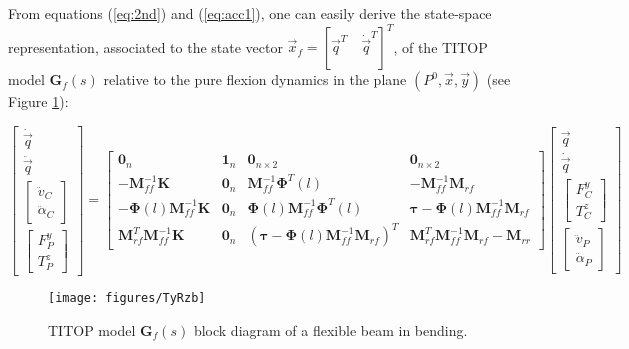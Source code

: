 From equations (\ref{eq:2nd}) and (\ref{eq:acc1}), one can easily derive the state-space representation, associated to the state vector $\vec{x}_f=[\vec{q}^T\quad \dot{\vec{q}}^T]^T$, of the TITOP model $\mathbf{G}_{f}(s)$ relative to the pure flexion dynamics in the plane $(P^0,\vec{x},\vec{y})$ (see Figure \ref{fig:TyRz}):
\begin{small}
\begin{equation}\label{eq:Gfss}
  \left[\begin{array}{c}\dot{\vec{q}} \\ \ddot{\vec{q}} \\ \left[\begin{array}{c} \hline \ddot{v}_C\\ \ddot{\alpha}_C \end{array}\right]\\ \left[\begin{array}{c} F^y_P \\ T^z_P\end{array}\right] \end{array}\right]=\left[\begin{array}{cc|cc} \mathbf{0}_n& \mathbf{1}_n & \mathbf{0}_{n \times 2}& \mathbf{0}_{n \times 2} \\ -\mathbf{M}_{ff}^{-1}\mathbf{K} & \mathbf{0}_n & \mathbf{M}_{ff}^{-1} \mathbf{\Phi}^T(l)& -\mathbf{M}_{ff}^{-1}\mathbf{M}_{rf} \\ \hline  -\mathbf{\Phi}(l)\mathbf{M}_{ff}^{-1}\mathbf{K} & \mathbf{0}_n & \mathbf{\Phi}(l)\mathbf{M}_{ff}^{-1} \mathbf{\Phi}^T(l) & \mathbf{\tau}-\mathbf{\Phi}(l)\mathbf{M}_{ff}^{-1}\mathbf{M}_{rf}\\\mathbf{M}^T_{rf}\mathbf{M}_{ff}^{-1}\mathbf{K}  & \mathbf{0}_n & (\mathbf{\tau}-\mathbf{\Phi}(l)\mathbf{M}_{ff}^{-1}\mathbf{M}_{rf})^T & \mathbf{M}^T_{rf}\mathbf{M}_{ff}^{-1}\mathbf{M}_{rf}-\mathbf{M}_{rr} \end{array}\right]\left[\begin{array}{c}\vec{q} \\ \dot{\vec{q}} \\ \hline \left[\begin{array}{c} F^y_C \\ T^z_C \end{array}\right]\\ \left[\begin{array}{c} \ddot{v}_P\\ \ddot{\alpha}_P \end{array}\right]  \end{array}\right]
\end{equation}
\end{small}
\begin{figure}[htbp!]
  \texttt{[image: figures/TyRzb]}
\caption{TITOP model $\mathbf{G}_{f}(s)$ block diagram of a flexible beam in bending.}
\label{fig:TyRz} 
\end{figure}

